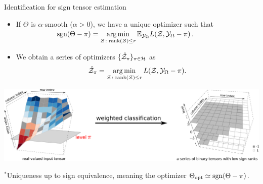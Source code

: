 \documentclass[10pt, mathserif]{beamer} %
\theoremstyle{definition}
\theoremstyle{plain}
\def\sign{\textup{sgn}}
\begin{document}
\begin{frame}{Identification for sign tensor estimation}
   \begin{itemize}
    \item If $\Theta$ is $\alpha$-smooth ($\alpha>0$), we have {\color{red}a unique optimizer}  such that\\[.1cm]
       $\hspace{2cm}\text{sgn}(\Theta-\pi) = \operatorname*{arg\,min}\limits_{\mathcal{Z}\colon \text{rank}(\mathcal{Z})\leq r} \mathbb{E}_{\mathcal{Y}_\Omega}L(\mathcal{Z},\mathcal{Y}_\Omega-\pi)$.\vspace*{.1cm}

    \item We obtain a series of optimizers $\{\hat {\mathcal{Z}}_\pi\}_{\pi\in\mathcal{H}}$ as
    \begin{align}
        \hat {\mathcal{Z}}_\pi = \operatorname*{arg\,min}_{\mathcal{Z}\colon \text{rank}(\mathcal{Z})\leq r}L(\mathcal{Z},\mathcal{Y}_\Omega-\pi).
    \end{align}
    \end{itemize}
 \vspace{-.2cm} 
 
     \begin{center}
 \includegraphics[width = \textwidth]{Figures/weightedclassification.pdf}
 \end{center}
 
     
     \vspace{-.4cm}
 {\hfill \tiny  $^*$Uniqueness up to sign equivalence, meaning the optimizer $\Theta_{\text{opt}} \simeq \sign(\Theta-\pi)$.}
\end{frame}
\end{document}
